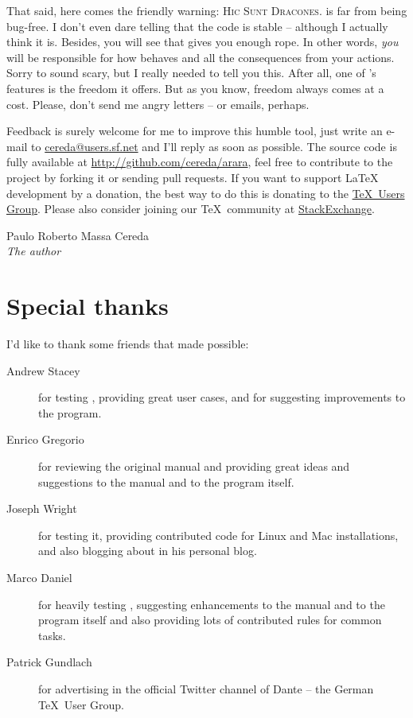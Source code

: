 \documentclass[a4paper,twoside,12pt]{memoir}
\begin{document}
That said, here comes the friendly warning: \textsc{Hic Sunt Dracones}. \arara 
is far from being bug-free. I don't even dare telling that the code is stable -- 
although I actually think it is. Besides, you will see that \arara gives you 
enough rope. In other words, \emph{you} will be responsible for how \arara 
behaves and all the consequences from your actions. Sorry to sound scary, but I 
really needed to tell you this. After all, one of \arara's features is the 
freedom it offers. But as you know, freedom always comes at a cost. Please, 
don't send me angry letters -- or emails, perhaps.

Feedback is surely welcome for me to improve this humble tool, just write an 
e-mail to \url{cereda@users.sf.net} and I'll reply as soon as possible. The 
source code is fully available at \url{http://github.com/cereda/arara}, feel 
free to contribute to the project by forking it or sending pull requests. If you 
want to support \LaTeX{} development by a donation, the best way to do this is 
donating to the \href{http://www.tug.org/}{\TeX\ Users Group}. Please also 
consider joining our \TeX\ community at 
\href{http://tex.stackexchange.com}{StackExchange}.

\vfill

\begin{flushright}
Paulo Roberto Massa Cereda\\
\emph{The author}
\end{flushright}

\cleardoublepage

\section*{Special thanks}

I'd like to thank some friends that made \arara possible:

\begin{description}
\item[Andrew Stacey] for testing \arara, providing great user cases, and for 
                     suggesting improvements to the program.
\item[Enrico Gregorio] for reviewing the original manual and providing great 
                       ideas and suggestions to the manual and to the program 
                       itself.
\item[Joseph Wright] for testing it, providing contributed code for Linux and Mac
                     installations, and also blogging about \arara in his 
                     personal blog.
\item[Marco Daniel] for heavily testing \arara, suggesting enhancements to the 
                    manual and to the program itself and also providing lots of 
                    contributed rules for common tasks.
\item[Patrick Gundlach] for advertising \arara in the official Twitter channel 
                        of Dante -- the German \TeX\ User Group.
\end{description}
\end{document}
